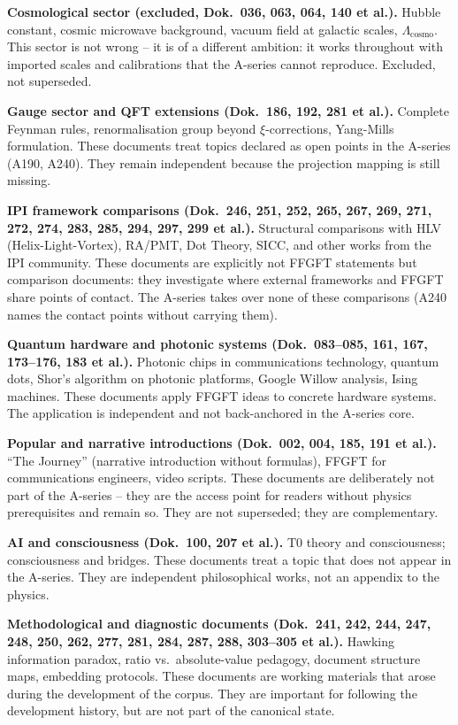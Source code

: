 \textbf{Cosmological sector (excluded, Dok.~036, 063, 064, 140 et al.).}
Hubble constant, cosmic microwave background, vacuum field at galactic scales,
$\Lambda_\text{cosmo}$. This sector is not wrong -- it is of a different ambition:
it works throughout with imported scales and calibrations that the A-series cannot
reproduce. Excluded, not superseded.

\textbf{Gauge sector and QFT extensions (Dok.~186, 192, 281 et al.).}
Complete Feynman rules, renormalisation group beyond $\xi$-corrections, Yang-Mills
formulation. These documents treat topics declared as open points in the A-series
(A190, A240). They remain independent because the projection mapping is still missing.

\textbf{IPI framework comparisons (Dok.~246, 251, 252, 265, 267, 269, 271, 272,
274, 283, 285, 294, 297, 299 et al.).} Structural comparisons with HLV
(Helix-Light-Vortex), RA/PMT, Dot Theory, SICC, and other works from the IPI
community. These documents are explicitly not FFGFT statements but comparison
documents: they investigate where external frameworks and FFGFT share points of
contact. The A-series takes over none of these comparisons (A240 names the contact
points without carrying them).

\textbf{Quantum hardware and photonic systems (Dok.~083--085, 161, 167,
173--176, 183 et al.).} Photonic chips in communications technology, quantum dots,
Shor's algorithm on photonic platforms, Google Willow analysis, Ising machines.
These documents apply FFGFT ideas to concrete hardware systems. The application is
independent and not back-anchored in the A-series core.

\textbf{Popular and narrative introductions (Dok.~002, 004, 185, 191 et al.).}
``The Journey'' (narrative introduction without formulas), FFGFT for communications
engineers, video scripts. These documents are deliberately not part of the A-series
-- they are the access point for readers without physics prerequisites and remain
so. They are not superseded; they are complementary.

\textbf{AI and consciousness (Dok.~100, 207 et al.).} T0 theory and consciousness;
consciousness and bridges. These documents treat a topic that does not appear in
the A-series. They are independent philosophical works, not an appendix to the
physics.

\textbf{Methodological and diagnostic documents (Dok.~241, 242, 244, 247, 248,
250, 262, 277, 281, 284, 287, 288, 303--305 et al.).} Hawking information paradox,
ratio vs.\ absolute-value pedagogy, document structure maps, embedding protocols.
These documents are working materials that arose during the development of the
corpus. They are important for following the development history, but are not part
of the canonical state.


